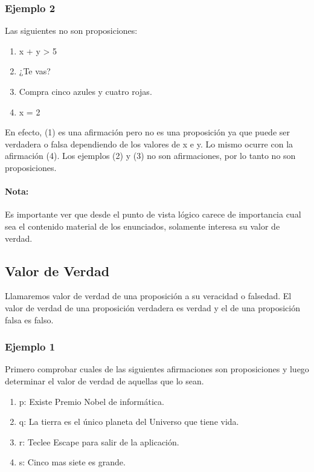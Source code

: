 \documentclass[a4paper,11pt,oneside,titlepage,final]{scrartc}
\begin{document}
\subsubsection*{Ejemplo 2}
Las siguientes no son proposiciones:
\begin{enumerate}
\item x + y > 5
\item ¿Te vas?
\item Compra cinco azules y cuatro rojas.
\item x = 2
\end{enumerate}

En efecto, (1) es una afirmación pero no es una proposición ya que puede ser verdadera o falsa dependiendo de los valores de x e y. Lo mismo ocurre con la afirmación (4). Los ejemplos (2) y (3) no son afirmaciones, por lo tanto no son proposiciones.\\

\paragraph{Nota:} Es importante ver que desde el punto de vista lógico carece de importancia cual sea el contenido material de los enunciados, solamente interesa su valor de verdad.\\

\subsection{Valor de Verdad}

Llamaremos valor de verdad de una proposición a su veracidad o falsedad. El valor de verdad de una proposición verdadera es verdad y el de una proposición falsa es falso.\\

\subsubsection*{Ejemplo 1}
Primero comprobar cuales de las siguientes afirmaciones son proposiciones y luego determinar el valor de verdad de aquellas que lo sean.

\begin{enumerate}
\item p: Existe Premio Nobel de informática.
\item q: La tierra es el único planeta del Universo que tiene vida.
\item r: Teclee Escape para salir de la aplicación.
\item s: Cinco mas siete es grande.
\end{enumerate}
\end{document}

